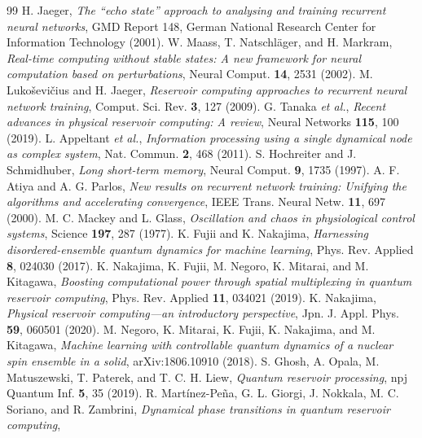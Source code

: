 \documentclass[aps,prresearch,preprint,superscriptaddress,amsmath,amssymb,floatfix]{revtex4-2}
\begin{document}
\begin{thebibliography}{99}
 H. Jaeger, \emph{The ``echo state'' approach to analysing and
  training recurrent neural networks}, GMD Report 148, German National Research Center
  for Information Technology (2001).
 W. Maass, T. Natschl\"ager, and H. Markram, \emph{Real-time
  computing without stable states: A new framework for neural computation based on
  perturbations}, Neural Comput. \textbf{14}, 2531 (2002).
 M. Luko\v{s}evi\v{c}ius and H. Jaeger, \emph{Reservoir
  computing approaches to recurrent neural network training}, Comput. Sci. Rev.
  \textbf{3}, 127 (2009).
 G. Tanaka \emph{et al.}, \emph{Recent advances in physical
  reservoir computing: A review}, Neural Networks \textbf{115}, 100 (2019).
 L. Appeltant \emph{et al.}, \emph{Information processing using
  a single dynamical node as complex system}, Nat. Commun. \textbf{2}, 468 (2011).
 S. Hochreiter and J. Schmidhuber, \emph{Long short-term
  memory}, Neural Comput. \textbf{9}, 1735 (1997).
 A. F. Atiya and A. G. Parlos, \emph{New results on recurrent
  network training: Unifying the algorithms and accelerating convergence}, IEEE Trans.
  Neural Netw. \textbf{11}, 697 (2000).
 M. C. Mackey and L. Glass, \emph{Oscillation and chaos in
  physiological control systems}, Science \textbf{197}, 287 (1977).
 K. Fujii and K. Nakajima, \emph{Harnessing disordered-ensemble
  quantum dynamics for machine learning}, Phys. Rev. Applied \textbf{8}, 024030
  (2017).
 K. Nakajima, K. Fujii, M. Negoro, K. Mitarai, and M. Kitagawa,
  \emph{Boosting computational power through spatial multiplexing in quantum reservoir
  computing}, Phys. Rev. Applied \textbf{11}, 034021 (2019).
 K. Nakajima, \emph{Physical reservoir computing---an
  introductory perspective}, Jpn. J. Appl. Phys. \textbf{59}, 060501 (2020).
 M. Negoro, K. Mitarai, K. Fujii, K. Nakajima, and M. Kitagawa,
  \emph{Machine learning with controllable quantum dynamics of a nuclear spin ensemble
  in a solid}, arXiv:1806.10910 (2018).
 S. Ghosh, A. Opala, M. Matuszewski, T. Paterek, and T. C. H. Liew,
  \emph{Quantum reservoir processing}, npj Quantum Inf. \textbf{5}, 35 (2019).
 R. Mart\'inez-Pe\~na, G. L. Giorgi, J. Nokkala, M. C. Soriano,
  and R. Zambrini, \emph{Dynamical phase transitions in quantum reservoir computing},

\end{thebibliography}
\end{document}
